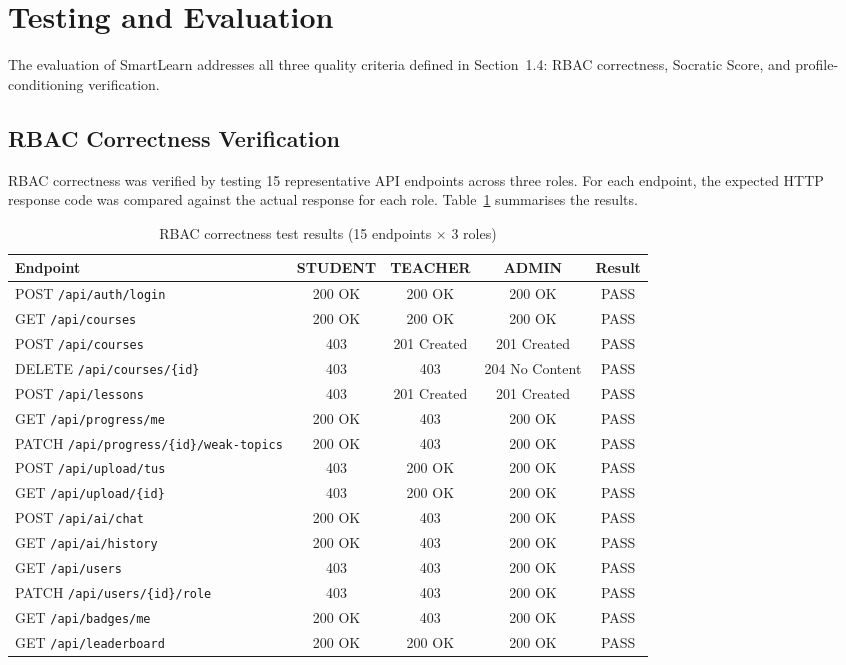 \documentclass[12pt,a4paper]{report}
\begin{document}
\section{Testing and Evaluation}

The evaluation of SmartLearn addresses all three quality criteria defined in Section~1.4:
RBAC correctness, Socratic Score, and profile-conditioning verification.

\subsection{RBAC Correctness Verification}

RBAC correctness was verified by testing 15 representative API endpoints across three
roles. For each endpoint, the expected HTTP response code was compared against the actual
response for each role. Table~\ref{tab:rbac} summarises the results.

\begin{table}[htbp]
\centering
\caption{RBAC correctness test results (15 endpoints $\times$ 3 roles)}
\label{tab:rbac}
\footnotesize
\renewcommand{\arraystretch}{1.25}
\begin{tabularx}{\textwidth}{X c c c c}
\toprule
\textbf{Endpoint} & \textbf{STUDENT} & \textbf{TEACHER} & \textbf{ADMIN} & \textbf{Result}\\
\midrule
POST \texttt{/api/auth/login} & 200 OK & 200 OK & 200 OK & PASS\\
GET \texttt{/api/courses} & 200 OK & 200 OK & 200 OK & PASS\\
POST \texttt{/api/courses} & 403 & 201 Created & 201 Created & PASS\\
DELETE \texttt{/api/courses/\{id\}} & 403 & 403 & 204 No Content & PASS\\
POST \texttt{/api/lessons} & 403 & 201 Created & 201 Created & PASS\\
GET \texttt{/api/progress/me} & 200 OK & 403 & 200 OK & PASS\\
PATCH \texttt{/api/progress/\{id\}/weak-topics} & 200 OK & 403 & 200 OK & PASS\\
POST \texttt{/api/upload/tus} & 403 & 200 OK & 200 OK & PASS\\
GET \texttt{/api/upload/\{id\}} & 403 & 200 OK & 200 OK & PASS\\
POST \texttt{/api/ai/chat} & 200 OK & 403 & 200 OK & PASS\\
GET \texttt{/api/ai/history} & 200 OK & 403 & 200 OK & PASS\\
GET \texttt{/api/users} & 403 & 403 & 200 OK & PASS\\
PATCH \texttt{/api/users/\{id\}/role} & 403 & 403 & 200 OK & PASS\\
GET \texttt{/api/badges/me} & 200 OK & 403 & 200 OK & PASS\\
GET \texttt{/api/leaderboard} & 200 OK & 200 OK & 200 OK & PASS\\
\bottomrule
\end{tabularx}
\end{table}
\end{document}
